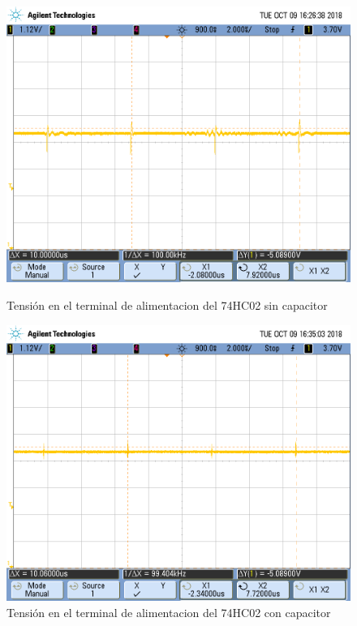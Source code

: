 \begin{figure}[H]
\begin{center}
  \begin{minipage}[b]{0.4\textwidth}
  	\begin{center}
  		\includegraphics[scale=0.18]{imagenes/sin_capacitor.png}
  	\end{center}
  \caption{Tensión en el terminal de alimentacion del 74HC02 sin capacitor}
  \label{4_fig1} 
  \end{minipage}
  \begin{minipage}[b]{0.4\textwidth}
    \begin{center}
  		\includegraphics[scale=0.18]{imagenes/con_capacitor.png}
	\end{center}
  \caption{Tensión en el terminal de alimentacion del 74HC02 con capacitor}
  \label{4_fig2}
 \end{minipage}
\end{center}
\end{figure}
